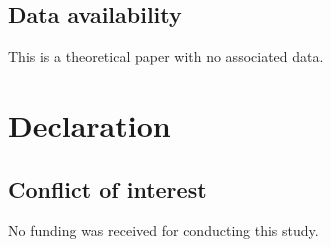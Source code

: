 \documentclass[12pt]{amsart}
\numberwithin{equation}{section}
\newcommand{\1}{\mathbf{1}}
\begin{document}
\subsection*{Data availability} This is a theoretical paper with no associated data.

\section*{Declaration}
\subsection*{Conflict of interest} No funding was received for conducting this study.



\end{document}
